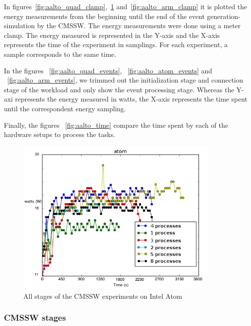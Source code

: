 In figures~\ref{fig:aalto_quad_clamp},~\ref{fig:aalto_atom_clamp} 
and~\ref{fig:aalto_arm_clamp} it is plotted the energy measurements from the beginning until the end of the event generation-simulation by the CMSSW. The energy measurements were done using a meter clamp. The energy measured is represented in the Y-axis and the X-axis represents the time of the experiment in samplings. For each experiment, a sample corresponds to the same time.

In the figures ~\ref{fig:aalto_quad_events}, ~\ref{fig:aalto_atom_events} and ~\ref{fig:aalto_arm_events}, we trimmed out the initialization stage and connection stage of the workload and only show the event processing stage. Whereas the Y-axi represents the energy measured in watts, the X-axis represents the time spent until the correspondent energy sampling.

Finally, the figures ~\ref{fig:aalto_time} compare the time spent by each of the hardware setups to process the tasks.

\begin{figure}[h]
  \centering
    \includegraphics[width=100mm]{"img/aalto/aalto_total_atom"}
    \caption{All stages of the CMSSW experiments on Intel Atom}
    \label{fig:aalto_atom_clamp}
\end{figure}


\subsubsection*{CMSSW stages}

